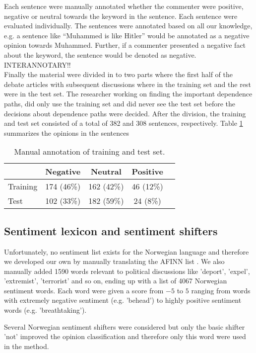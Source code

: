 \documentclass[11pt]{article}
\begin{document}
Each sentence were manually annotated whether the commenter were positive, negative or neutral towards the keyword in the sentence. Each sentence were evaluated individually. The sentences were annotated based on all our knowledge, e.g. a sentence like ``Muhammed is like Hitler'' would be annotated as a negative opinion towards Muhammed. Further, if a commenter presented a negative fact about the keyword, the sentence would be denoted as negative.\\
INTERANNOTARY!!\\
Finally the material were divided in to two parts where the first half of the debate articles with subsequent discussions where in the training set and the rest were in the test set. The researcher working on finding the important dependence paths, did only use the training set and did never see the test set before the decisions about dependence paths were decided. After the division, the training and test set consisted of a total of 382 and 308 sentences, respectively. Table \ref{tab:1} summarizes the opinions in the sentences
\begin{table}
  \centering
  \begin{tabular}{lcccc}
             & Negative & Neutral & Positive \\\hline
    Training & 174 (46\%) & 162 (42\%) & 46 (12\%)\\
    Test     & 102 (33\%)& 182 (59\%) & 24 (8\%)
  \end{tabular}
  \caption{Manual annotation of training and test set.}
  \label{tab:1}
\end{table}

\subsection{Sentiment lexicon and sentiment shifters}

Unfortunately, no sentiment list exists for the Norwegian language and therefore we developed our own by manually translating the AFINN list \cite{Nielsen11}. We also manually added 1590 words relevant to political discussions  like 'deport', 'expel', 'extremist', 'terrorist' and so on, ending up with a list of 4067 Norwegian sentiment words. Each word were given a score from $-5$ to $5$ ranging from words with extremely negative sentiment (e.g. 'behead') to highly positive sentiment words (e.g. 'breathtaking').

Several Norwegian sentiment shifters were considered but only the basic shifter 'not' improved the opinion classification and therefore only this word were used in the method.
\end{document}
